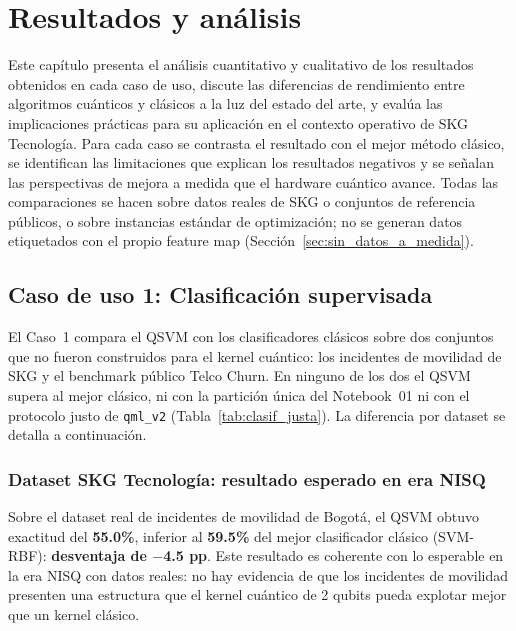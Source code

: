 \chapter{Resultados y análisis}\label{cap:evaluacion}

Este capítulo presenta el análisis cuantitativo y cualitativo de los resultados obtenidos en cada caso de uso, discute las diferencias de rendimiento entre algoritmos cuánticos y clásicos a la luz del estado del arte, y evalúa las implicaciones prácticas para su aplicación en el contexto operativo de SKG Tecnología. Para cada caso se contrasta el resultado con el mejor método clásico, se identifican las limitaciones que explican los resultados negativos y se señalan las perspectivas de mejora a medida que el hardware cuántico avance. Todas las comparaciones se hacen sobre datos reales de SKG o conjuntos de referencia públicos, o sobre instancias estándar de optimización; no se generan datos etiquetados con el propio feature map (Sección~\ref{sec:sin_datos_a_medida}).

\section{Caso de uso 1: Clasificación supervisada}

El Caso~1 compara el QSVM con los clasificadores clásicos sobre dos conjuntos que no fueron construidos para el kernel cuántico: los incidentes de movilidad de SKG y el benchmark público Telco Churn. En ninguno de los dos el QSVM supera al mejor clásico, ni con la partición única del Notebook~01 ni con el protocolo justo de \texttt{qml\_v2} (Tabla~\ref{tab:clasif_justa}). La diferencia por dataset se detalla a continuación.

\subsection{Dataset SKG Tecnología: resultado esperado en era NISQ}

Sobre el dataset real de incidentes de movilidad de Bogotá, el QSVM obtuvo exactitud del \textbf{55.0\%}, inferior al \textbf{59.5\%} del mejor clasificador clásico (SVM-RBF): \textbf{desventaja de $-$4.5 pp}. Este resultado es coherente con lo esperable en la era NISQ con datos reales: no hay evidencia de que los incidentes de movilidad presenten una estructura que el kernel cuántico de 2 qubits pueda explotar mejor que un kernel clásico.

